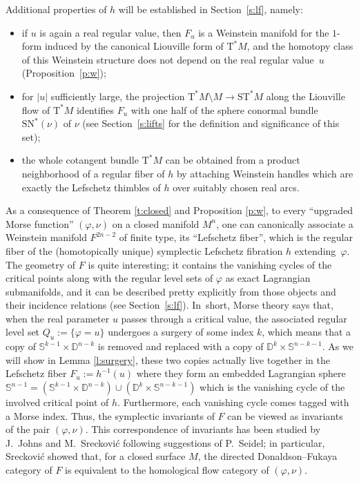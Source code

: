 \documentclass[10pt]{amsart}
\newcommand{\D}{{\mathbb D}}
\newcommand{\bS}{{\mathbb S}}
\newcommand{\sSN}{\mathrm{SN}^\ast}
\newcommand{\sT}{\mathrm{T}^\ast}
\newcommand{\sST}{\mathrm{ST}^\ast}
\newcommand{\de}{\mathrel{:=}}
\theoremstyle{plain}
\theoremstyle{definition}
\begin{document}
Additional properties of $h$ will be established in Section~\ref{s:lf}, namely:
\begin{itemize}
\item
if $u$ is again a real regular value, then $F_u$ is a Weinstein manifold for the
$1$\nobreakdash-form induced by the canonical Liouville form of $\sT M$, and the homotopy
class of this Weinstein structure does not depend on the real regular value~$u$
(\cf Proposition~\ref{p:w});
\item
for $|u|$ sufficiently large, the projection $\sT M \setminus M \to \sST M$ along the
Liouville flow of $\sT M$ identifies $F_u$ with one half of the sphere conormal
bundle $\sSN(\nu)$ of $\nu$ (see Section~\ref{s:lifts} for the definition and
significance of this set);
\item
the whole cotangent bundle $\sT M$ can be obtained from a product neighborhood
of a regular fiber of $h$ by attaching Weinstein handles which are exactly the
Lefschetz thimbles of $h$ over suitably chosen real arcs.
\end{itemize}
As a consequence of Theorem \ref{t:closed} and Proposition \ref{p:w}, to every
``upgraded Morse function'' $(\varphi,\nu)$ on a closed manifold $M^n$, one can
canonically associate a Weinstein manifold $F^{2n-2}$ of finite type, its
``Lefschetz fiber'', which is the regular fiber of the (homotopically unique)
symplectic Lefschetz fibration $h$ extending~$\varphi$. The geometry of $F$ is
quite interesting; it contains the vanishing cycles of the critical points along
with the regular level sets of $\varphi$ as exact Lagrangian submanifolds, and
it can be described pretty explicitly from those objects and their incidence
relations (see Section~\ref{s:lf}). In~short, Morse theory says that, when the
real parameter $u$ passes through a critical value, the associated regular level
set $Q_u \de \{\varphi=u\}$ undergoes a surgery of some index $k$, which means
that a copy of $\bS^{k-1} \times \D^{n-k}$ is removed and replaced with a copy of
$\D^k \times \bS^{n-k-1}$. As we will show in Lemma \ref {l:surgery}, these two
copies actually live together in the Lefschetz fiber $F_u \de h^{-1}(u)$ where
they form an embedded Lagrangian sphere $\bS^{n-1} = (\bS^{k-1} \times \D^{n-k})
\cup (\D^k \times \bS^{n-k-1})$ which is the vanishing cycle of the involved
critical point of $h$. Furthermore, each vanishing cycle comes tagged with a
Morse index. Thus, the symplectic invariants of $F$ can be viewed as invariants
of the pair $(\varphi,\nu)$. This correspondence of invariants has been studied
by J.~Johns and M.~Sreckovi\'c \cite{Jo2,Sr} following suggestions of P.~Seidel;
in particular, Sreckovi\'c showed that, for a closed surface $M$, the directed
Donaldson--Fukaya category of $F$ is equivalent to the homological flow category
of $(\varphi,\nu)$.
\end{document}
